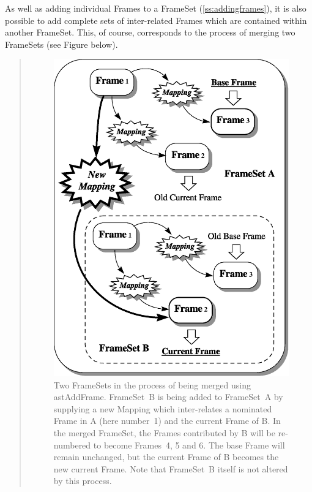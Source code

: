 \documentclass[twoside,11pt]{article}
\newcommand{\secref}[1]{\S\ref{#1}}
\renewcommand{\secref}[1]{\ref{#1}}
\begin{document}
\begin{htmlonly}
   As well as adding individual Frames to a FrameSet
   (\secref{ss:addingframes}), it is also possible to add complete sets of
   inter-related Frames which are contained within another
   FrameSet. This, of course, corresponds to the process of merging two
   FrameSets (see Figure below).
   \begin{quote}
   \begin{figure}[hbtp]
   \label{fig:fsmerge}
   \includegraphics[scale=0.75]{sun211_figures/fsmerge.eps}
   \caption{Two FrameSets in the process of being merged using
   astAddFrame. FrameSet~B is being added to FrameSet~A by supplying a
   new Mapping which inter-relates a nominated Frame in A (here number~1)
   and the current Frame of B. In the merged FrameSet, the Frames
   contributed by B will be re-numbered to become Frames~4, 5 and 6. The
   base Frame will remain unchanged, but the current Frame of B becomes
   the new current Frame. Note that FrameSet~B itself is not
   altered by this process.}
   \end{figure}
   \end{quote}
\end{htmlonly}
\end{document}
